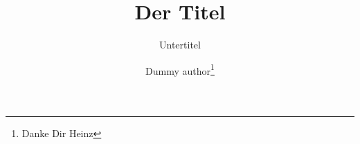 \documentclass[a4paper]{tubsreprt}
\title{Der Titel}
\subtitle{Untertitel}
\author{Dummy author\thanks{Danke Dir Heinz}}
\begin{document}
\dedication{Gewidmet den Freunden der Typographie}


\maketitle[image]

\makebackpage[info]

\lipsum[1-9]
\end{document}
